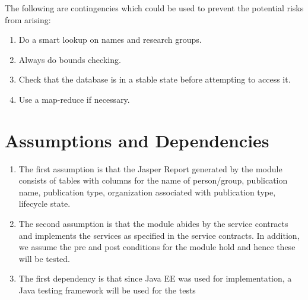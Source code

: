 	The following are contingencies which could be used to prevent the potential risks from arising:
\begin{enumerate}

	\item Do a smart lookup on names and research groups.
	\item Always do bounds checking.
	\item Check that the database is in a stable state before attempting to access it.
	\item Use a map-reduce if necessary.
         

\end{enumerate} 

\section{Assumptions and Dependencies}

\begin{enumerate}
	\item The first assumption is that the Jasper Report generated by the module consists of tables with columns for the name of person/group, publication name, publication type, organization associated with publication type, lifecycle state.
	\item The second assumption is that the module abides by the service contracts and implements the services as specified in the service contracts. In addition, we assume the pre and post conditions for the module hold and hence these will be tested.
	\item The first dependency is that since Java EE was used for implementation, a Java testing framework will be used for the tests
\end{enumerate}
